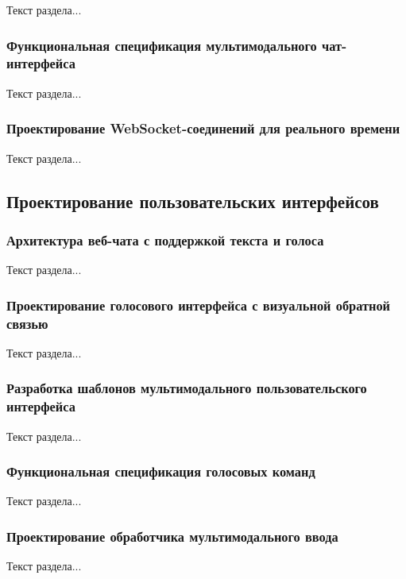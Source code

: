 Текст раздела...

\subsubsection{Функциональная спецификация мультимодального чат-интерфейса}

Текст раздела...

\subsubsection{Проектирование WebSocket-соединений для реального времени}

Текст раздела...

\subsection{Проектирование пользовательских интерфейсов}

\subsubsection{Архитектура веб-чата с поддержкой текста и голоса}

Текст раздела...

\subsubsection{Проектирование голосового интерфейса с визуальной обратной связью}

Текст раздела...

\subsubsection{Разработка шаблонов мультимодального пользовательского интерфейса}

Текст раздела...

\subsubsection{Функциональная спецификация голосовых команд}

Текст раздела...

\subsubsection{Проектирование обработчика мультимодального ввода}

Текст раздела...


